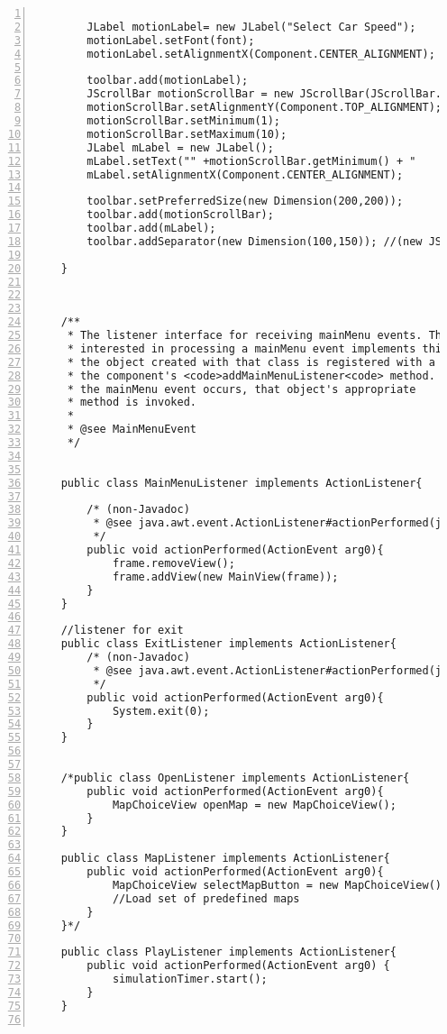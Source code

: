 \begin{lstlisting}[numbers=left, numberstyle=\small, numbersep=8pt,  framexleftmargin=1pt, framexrightmargin=10pt ]
		
		JLabel motionLabel= new JLabel("Select Car Speed"); 
		motionLabel.setFont(font);
		motionLabel.setAlignmentX(Component.CENTER_ALIGNMENT);
		
		toolbar.add(motionLabel);
		JScrollBar motionScrollBar = new JScrollBar(JScrollBar.HORIZONTAL,1, 1, 0, 10);
		motionScrollBar.setAlignmentY(Component.TOP_ALIGNMENT);
		motionScrollBar.setMinimum(1);
		motionScrollBar.setMaximum(10);
		JLabel mLabel = new JLabel();
		mLabel.setText("" +motionScrollBar.getMinimum() + "                               " + motionScrollBar.getMaximum());
		mLabel.setAlignmentX(Component.CENTER_ALIGNMENT);
		
		toolbar.setPreferredSize(new Dimension(200,200));
		toolbar.add(motionScrollBar);
		toolbar.add(mLabel);
		toolbar.addSeparator(new Dimension(100,150)); //(new JSeparator(SwingConstants.HORIZONTAL));

	}
	
	
	
	/**
	 * The listener interface for receiving mainMenu events. The class that is
	 * interested in processing a mainMenu event implements this interface, and
	 * the object created with that class is registered with a component using
	 * the component's <code>addMainMenuListener<code> method. When
	 * the mainMenu event occurs, that object's appropriate
	 * method is invoked.
	 *
	 * @see MainMenuEvent
	 */

	
	public class MainMenuListener implements ActionListener{
		
		/* (non-Javadoc)
		 * @see java.awt.event.ActionListener#actionPerformed(java.awt.event.ActionEvent)
		 */
		public void actionPerformed(ActionEvent arg0){
			frame.removeView();
			frame.addView(new MainView(frame));
		}
	}
	
	//listener for exit
	public class ExitListener implements ActionListener{	
		/* (non-Javadoc)
		 * @see java.awt.event.ActionListener#actionPerformed(java.awt.event.ActionEvent)
		 */
		public void actionPerformed(ActionEvent arg0){
			System.exit(0);
		}
	}
	
	
	/*public class OpenListener implements ActionListener{
		public void actionPerformed(ActionEvent arg0){
			MapChoiceView openMap = new MapChoiceView();
		}
	}
	
	public class MapListener implements ActionListener{
		public void actionPerformed(ActionEvent arg0){
			MapChoiceView selectMapButton = new MapChoiceView();
			//Load set of predefined maps
		}
	}*/

	public class PlayListener implements ActionListener{
		public void actionPerformed(ActionEvent arg0) {
			simulationTimer.start();
		}
	}
	

\end{lstlisting}
